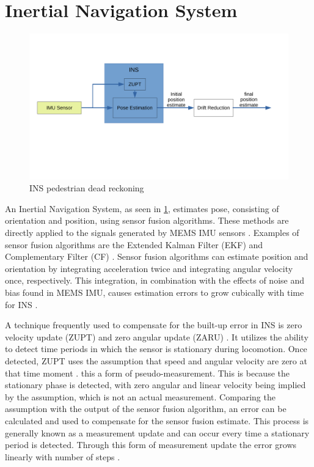\section{Inertial Navigation System}
\label{sec:INS}
\begin{figure}[H]
	\centering
	\includegraphics[trim=20 140 290 80, clip, width=0.8\linewidth]{images/INS_diagram}
	\caption{\ac{INS} pedestrian dead reckoning}
	\label{fig:ins_diagram}
\end{figure}
An Inertial Navigation System, as seen in \cref{fig:ins_diagram}, estimates pose, consisting of orientation and position, using sensor fusion algorithms. These methods are directly applied to the signals generated by MEMS IMU sensors \cite{Wu2019}. Examples of sensor fusion algorithms are the Extended Kalman Filter (EKF) and Complementary Filter (CF) \cite{Kok2017}. Sensor fusion algorithms can estimate position and orientation by integrating acceleration twice and integrating angular velocity once, respectively. This integration, in combination with the effects of noise and bias found in MEMS IMU, causes estimation errors to grow cubically with time for INS \cite{Harle2013}. \par

A technique frequently used to compensate for the built-up error in INS is zero velocity update (ZUPT) and zero angular update (ZARU) \cite{Harle2013}. It utilizes the ability to detect time periods in which the sensor is stationary during locomotion. Once detected, ZUPT uses the assumption that speed and angular velocity are zero at that time moment \cite{Wu2019,Harle2013}. this a form of pseudo-measurement. This is because the stationary phase is detected, with zero angular and linear velocity being implied by the assumption, which is not an actual measurement. Comparing the assumption with the output of the sensor fusion algorithm, an error can be calculated and used to compensate for the sensor fusion estimate. This process is generally known as a measurement update and can occur every time a stationary period is detected.  Through this form of measurement update the error grows linearly with number of steps \cite{foxlin2005pedestrian}.\par

